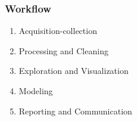 \documentclass[12pt]{beamer}\usepackage[]{graphicx}\usepackage[]{color}
\begin{document}

\begin{frame}[fragile]
\begin{center}
\end{center}
\end{frame}


\begin{frame}[fragile]
\begin{center}
\end{center}
\end{frame}


\begin{frame}[fragile]
\begin{center}
\end{center}
\end{frame}


\begin{frame}[fragile]
\begin{center}
\end{center}
\end{frame}


\begin{frame}
\begin{center}
\Huge{}
\end{center}
\end{frame}


\begin{frame}
\frametitle{Workflow}

\begin{enumerate}
 \item Acquisition-collection
 \item Processing and Cleaning
 \item Exploration and Visualization
 \item Modeling
 \item Reporting and Communication
\end{enumerate}
\eb

\end{frame}
\end{document}
